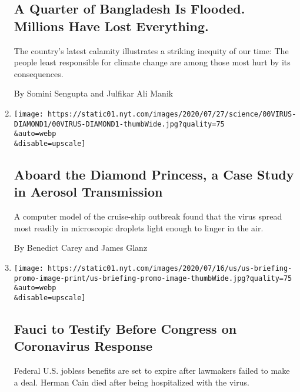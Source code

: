 \begin{enumerate}
  \hypertarget{a-quarter-of-bangladesh-is-flooded-millions-have-lost-everything}{%
  \subsection{A Quarter of Bangladesh Is Flooded. Millions Have Lost
  Everything.}\label{a-quarter-of-bangladesh-is-flooded-millions-have-lost-everything}}

  The country's latest calamity illustrates a striking inequity of our
  time: The people least responsible for climate change are among those
  most hurt by its consequences.

  By Somini Sengupta and Julfikar Ali Manik
\item
  \href{/2020/07/30/health/diamond-princess-coronavirus-aerosol.html}{}

  \texttt{[image: https://static01.nyt.com/images/2020/07/27/science/00VIRUS-DIAMOND1/00VIRUS-DIAMOND1-thumbWide.jpg?quality=75\\\&auto=webp\\\&disable=upscale]}

  \hypertarget{aboard-the-diamond-princess-a-case-study-in-aerosol-transmission}{%
  \subsection{Aboard the Diamond Princess, a Case Study in Aerosol
  Transmission}\label{aboard-the-diamond-princess-a-case-study-in-aerosol-transmission}}

  A computer model of the cruise-ship outbreak found that the virus
  spread most readily in microscopic droplets light enough to linger in
  the air.

  By Benedict Carey and James Glanz
\item
  \href{/2020/07/30/world/coronavirus-covid-19.html}{}

  \texttt{[image: https://static01.nyt.com/images/2020/07/16/us/us-briefing-promo-image-print/us-briefing-promo-image-thumbWide.jpg?quality=75\\\&auto=webp\\\&disable=upscale]}

  \hypertarget{fauci-to-testify-before-congress-on-coronavirus-response}{%
  \subsection{Fauci to Testify Before Congress on Coronavirus
  Response}\label{fauci-to-testify-before-congress-on-coronavirus-response}}

  Federal U.S. jobless benefits are set to expire after lawmakers failed
  to make a deal. Herman Cain died after being hospitalized with the
  virus.
\end{enumerate}

